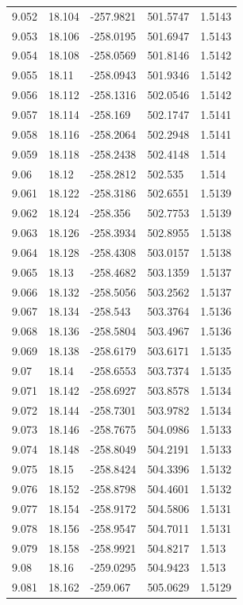 \begin{tabular}{lllll}
9.052 & 18.104 & -257.9821 & 501.5747 & 1.5143 \\
9.053 & 18.106 & -258.0195 & 501.6947 & 1.5143 \\
9.054 & 18.108 & -258.0569 & 501.8146 & 1.5142 \\
9.055 & 18.11 & -258.0943 & 501.9346 & 1.5142 \\
9.056 & 18.112 & -258.1316 & 502.0546 & 1.5142 \\
9.057 & 18.114 & -258.169 & 502.1747 & 1.5141 \\
9.058 & 18.116 & -258.2064 & 502.2948 & 1.5141 \\
9.059 & 18.118 & -258.2438 & 502.4148 & 1.514 \\
9.06 & 18.12 & -258.2812 & 502.535 & 1.514 \\
9.061 & 18.122 & -258.3186 & 502.6551 & 1.5139 \\
9.062 & 18.124 & -258.356 & 502.7753 & 1.5139 \\
9.063 & 18.126 & -258.3934 & 502.8955 & 1.5138 \\
9.064 & 18.128 & -258.4308 & 503.0157 & 1.5138 \\
9.065 & 18.13 & -258.4682 & 503.1359 & 1.5137 \\
9.066 & 18.132 & -258.5056 & 503.2562 & 1.5137 \\
9.067 & 18.134 & -258.543 & 503.3764 & 1.5136 \\
9.068 & 18.136 & -258.5804 & 503.4967 & 1.5136 \\
9.069 & 18.138 & -258.6179 & 503.6171 & 1.5135 \\
9.07 & 18.14 & -258.6553 & 503.7374 & 1.5135 \\
9.071 & 18.142 & -258.6927 & 503.8578 & 1.5134 \\
9.072 & 18.144 & -258.7301 & 503.9782 & 1.5134 \\
9.073 & 18.146 & -258.7675 & 504.0986 & 1.5133 \\
9.074 & 18.148 & -258.8049 & 504.2191 & 1.5133 \\
9.075 & 18.15 & -258.8424 & 504.3396 & 1.5132 \\
9.076 & 18.152 & -258.8798 & 504.4601 & 1.5132 \\
9.077 & 18.154 & -258.9172 & 504.5806 & 1.5131 \\
9.078 & 18.156 & -258.9547 & 504.7011 & 1.5131 \\
9.079 & 18.158 & -258.9921 & 504.8217 & 1.513 \\
9.08 & 18.16 & -259.0295 & 504.9423 & 1.513 \\
9.081 & 18.162 & -259.067 & 505.0629 & 1.5129 \\

\end{tabular}
